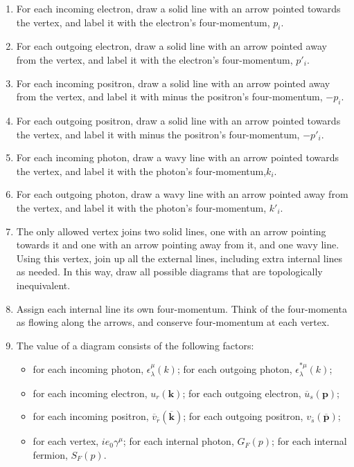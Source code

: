 \begin{enumerate}
\item For each incoming electron, draw a solid line with an arrow pointed towards the vertex, and label it with the electron's four-momentum, $p_i$.
\item For each outgoing electron, draw a solid line with an arrow pointed away from the vertex, and label it with the electron's four-momentum, $p'_i$.
\item For each incoming positron, draw a solid line with an arrow pointed away from the vertex, and label it with minus the positron's four-momentum, $-p_i$.
\item For each outgoing positron, draw a solid line with an arrow pointed towards the vertex, and label it with minus the positron's four-momentum, $-p'_i$.
\item For each incoming photon, draw a wavy line with an arrow pointed towards the vertex, and label it with the photon's four-momentum,$k_i$.
\item For each outgoing photon, draw a wavy line with an arrow pointed away from the vertex, and label it with the photon's four-momentum, $k'_i$.
\item The only allowed vertex joins two solid lines, one with an arrow pointing towards it and one with an arrow pointing away from it, and one wavy line. Using this vertex, join up all the external lines, including extra internal lines as needed. In this way, draw all possible diagrams that are topologically inequivalent.
\item Assign each internal line its own four-momentum. Think of the four-momenta as flowing along the arrows, and conserve four-momentum at each vertex. 
\item The value of a diagram consists of the following factors:
\begin{itemize}
\item for each incoming photon, $\epsilon^{\mu}_{\lambda}(k)$; 
for each outgoing photon, $\epsilon^{*\mu}_{\lambda}(k)$;
\item for each incoming electron, $u_{r}(\bm{k})$; for each outgoing electron, $\overline{u}_{s}(\bm{p})$;
\item for each incoming positron, $\overline{v}_{\overline{r}}(\overline{\bm{k}})$; for each outgoing positron, $v_{\overline{s}}(\overline{\bm{p}})$;
\item for each vertex, $ie_0 \gamma^{\mu}$;
for each internal photon, $G_F(p)$;
for each internal fermion, $S_F(p)$.
\end{itemize}

\end{enumerate}
